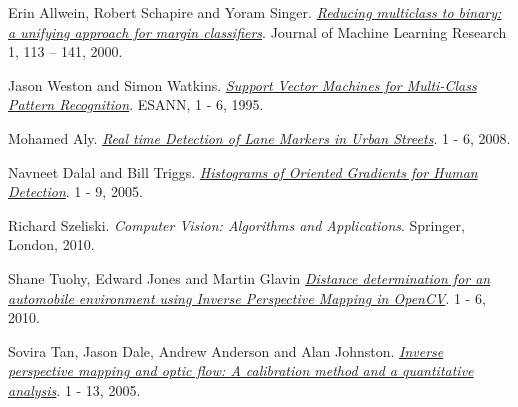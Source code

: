 \begin{thebibliography}{9}
	\hypertarget{ErinAllweinRobertSchapireYoramSinger}{} 
	Erin Allwein, Robert Schapire and Yoram Singer.
	\textit{\href{http://www.jmlr.org/papers/volume1/allwein00a/allwein00a.pdf}{Reducing multiclass to binary: a unifying approach for margin classifiers}}.
	Journal of Machine Learning Research 1, 113 – 141, 2000.
	
	\hypertarget{JasonWestonSimonWatkins}{} 
	Jason Weston and Simon Watkins.
	\textit{\href{https://www.elen.ucl.ac.be/Proceedings/esann/esannpdf/es1999-461.pdf}{Support Vector Machines for Multi-Class Pattern Recognition}}.
	ESANN, 1 - 6, 1995.
	
	\hypertarget{MohamedAly}{}  
	Mohamed Aly.
	\textit{\href{http://www.vision.caltech.edu/malaa/publications/aly08realtime.pdf}{Real time Detection of Lane Markers in Urban Streets}}.
	1 - 6, 2008.
	
	\hypertarget{NavneetDalalBillTriggs}{}  
	Navneet Dalal and Bill Triggs. 
	\textit{\href{https://hal.inria.fr/file/index/docid/548512/filename/hog\_cvpr2005.pdf}{Histograms of Oriented Gradients for Human Detection}}.
	1 - 9, 2005.
		
	\hypertarget{RichardSzeliski}{}
	Richard Szeliski. 
	\textit{Computer Vision: Algorithms and Applications}. 
	Springer, London, 2010.
		
	\hypertarget{ShaneTuohyEdwardJonesMartinGlavin}{} 
	Shane Tuohy, Edward Jones and Martin Glavin
	\textit{\href{https://www.researchgate.net/profile/Martin\_Glavin/publication/224195999\_Distance\_determination\_for\_an\_automobile\_environment\_using\_Inverse\_Perspective\_Mapping\_in\_OpenCV/links/00b4951c994745bf6b000000/Distance-determination-for-an-automobile-environment-using-Inverse-Perspective-Mapping-in-OpenCV.pdf}{Distance determination for an automobile environment using Inverse Perspective Mapping in OpenCV}}.
	1 - 6, 2010.
		
	\hypertarget{SoviraTanJasonDaleAndrewAndersonAlanJohnston}{} 
	Sovira Tan, Jason Dale, Andrew Anderson and Alan Johnston.
	\textit{\href{https://www.researchgate.net/profile/Alan\_Johnston2/publication/222433205\_Inverse\_Perspective\_Mapping\_and\_Optic\_Flow\_A\_Calibration\_Method\_and\_a\_Quantitative\_Analysis/links/53f4986c0cf22be01c3ed295/Inverse-Perspective-Mapping-and-Optic-Flow-A-Calibration-Method-and-a-Quantitative-Analysis.pdf}{Inverse perspective mapping and optic flow: A calibration method and a quantitative analysis}}.
	1 - 13, 2005.
		

\end{thebibliography}

